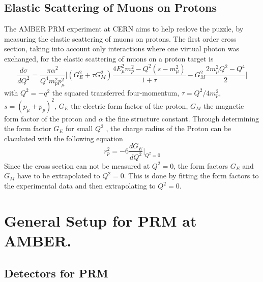 \subsection{Elastic Scattering of Muons on Protons}
The AMBER PRM experiment at CERN aims to help reslove the puzzle, by measuring the elastic scattering of muons on protons.
The first order cross section, taking into account only interactions where one virtual photon was exchanged, 
for the elastic scattering of muons on a proton target is 
\begin{equation}
\label{eq:cross_section}
\frac{d\sigma}{dQ^2} = \frac{\pi \alpha^2}{Q^4 m_p^2 p_\mu^2} \bigg[ \left( G_E^2 + \tau G_M^2 \right) \frac{ 4E_\mu^2 m_p^2 
- Q^2 (s - m_\mu^2)}{1 + \tau }  - G_M^2 \frac{ 2m_\mu^2 Q^2 - Q^4}{2} \bigg]
\end{equation}
with  $Q^2 = -q^2$ 	the squared transferred four-momentum, $\tau = Q^2 / 4m_p^2$, $s = (p_\mu + p_p)^2$, 
 $G_E$ the electric form factor of the proton,
  $G_M$ the magnetic form factor of the proton and $\alpha$ the fine structure constant.\autocite{intentAmber}
Through determining the form factor $G_E$ for small $Q^2$ , the charge radius of the Proton can be claculated with the following equation\autocite{intentAmber}
\begin{equation}
\label{eq:charge_radius}
r_p^2 = -6 \frac{dG_E}{dQ^2} \bigg|_{Q^2 = 0}
\end{equation}
Since the cross section can not be measured at $Q^2 = 0$, the form factors $G_E$ and $G_M$ have to be extrapolated to $Q^2 = 0$.
This is done by fitting the form factors to the experimental data and then extrapolating to $Q^2 = 0$.\autocite{intentAmber}
\section{General Setup for PRM at AMBER.}\label{sec:general_setup}
\subsection{Detectors for PRM}

